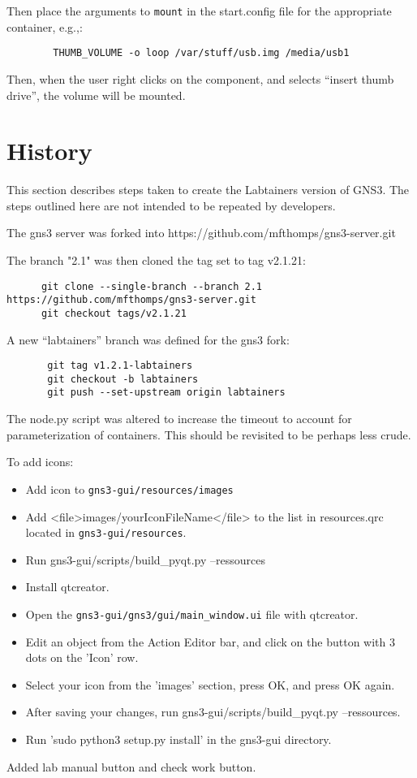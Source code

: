 \documentclass[12pt]{article}
\begin{document}
Then place the arguments to {\tt mount} in the start.config file for the appropriate container, e.g.,:
\begin{verbatim}
        THUMB_VOLUME -o loop /var/stuff/usb.img /media/usb1
\end{verbatim}
\noindent Then, when the user right clicks on the component, and selects ``insert thumb drive'', the volume will be mounted.

\section{History}
This section describes steps taken to create the Labtainers version of GNS3.
The steps outlined here are not intended to be repeated by developers.

The gns3 server was forked into https://github.com/mfthomps/gns3-server.git

The branch "2.1" was then cloned the tag set to tag v2.1.21:
\small
\begin{verbatim}
      git clone --single-branch --branch 2.1 https://github.com/mfthomps/gns3-server.git
      git checkout tags/v2.1.21
\end{verbatim}

\normalsize
\noindent A new ``labtainers'' branch was defined for the gns3 fork:
\begin{verbatim}
       git tag v1.2.1-labtainers
       git checkout -b labtainers
       git push --set-upstream origin labtainers
\end{verbatim}

The node.py script was altered to increase the timeout to account for parameterization of
containers.  This should be revisited to be perhaps less crude.

\bigskip
To add icons: 
\begin{itemize}
	\item Add icon to {\tt gns3-gui/resources/images}
	\item Add  <file>images/yourIconFileName</file> to the list in resources.qrc located in {\tt gns3-gui/resources}.
	\item Run gns3-gui/scripts/build\_pyqt.py --ressources
	\item Install qtcreator. 
	\item Open the {\tt gns3-gui/gns3/gui/main\_window.ui} file with qtcreator.
	\item Edit an object from the Action Editor bar, and click on the button with 3 dots on the 'Icon' row. 
	\item Select your icon from the 'images' section, press OK, and press OK again.
	\item After saving your changes, run gns3-gui/scripts/build\_pyqt.py --ressources.
	\item Run 'sudo python3 setup.py install' in the gns3-gui directory.
\end{itemize}
Added lab manual button and check work button.
\end{document}
